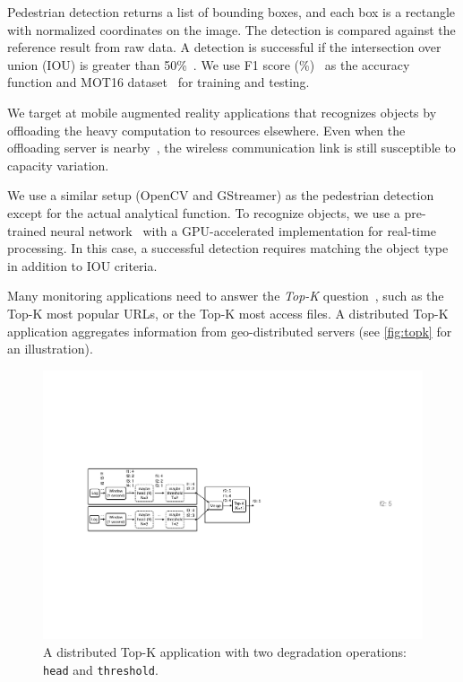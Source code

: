 Pedestrian detection returns a list of bounding boxes, and each box is a
rectangle with normalized coordinates on the image. The detection is compared
against the reference result from raw data. A detection is successful if the
intersection over union (IOU) is greater than
50\%~\cite{everingham2010pascal}. We use F1 score
(\%)~\cite{Rijsbergen:1979:IR:539927} as the accuracy function and MOT16
dataset~\cite{milan2016mot16} for training and testing.

 We target at mobile augmented reality applications
that recognizes objects by offloading the heavy computation to resources
elsewhere. Even when the offloading server is
nearby~\cite{satyanarayanan2009case, zhang2015cloud}, the wireless communication
link is still susceptible to capacity variation.

We use a similar setup (OpenCV and GStreamer) as the pedestrian detection except
for the actual analytical function. To recognize objects, we use a pre-trained
neural network~\cite{darknet13, redmon2016yolo9000} with a GPU-accelerated
implementation for real-time processing. In this case, a successful detection
requires matching the object type in addition to IOU criteria.

 Many monitoring applications need to answer the
\textit{Top-K} question~\cite{babcock2003distributed}, such as the Top-K most
popular URLs, or the Top-K most access files. A distributed Top-K application
aggregates information from geo-distributed servers (see \autoref{fig:topk} for
an illustration).

\begin{figure}
  \centering
  \includegraphics[width=\columnwidth]{figures/topk.pdf}
  \caption{A distributed Top-K application with two degradation operations:
    \texttt{head} and \texttt{threshold}.}
  \label{fig:topk}
\end{figure}

